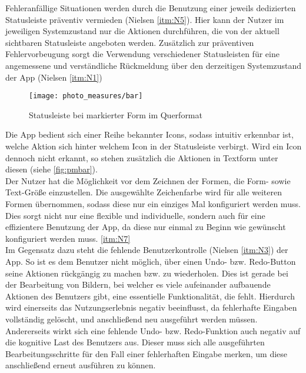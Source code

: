 Fehleranfällige Situationen werden durch die Benutzung einer jeweils dedizierten Statusleiste präventiv vermieden (Nielsen \autoref{itm:N5}).
Hier kann der Nutzer im jeweiligen Systemzustand nur die Aktionen durchführen, die von der aktuell sichtbaren Statusleiste angeboten werden.
Zusätzlich zur präventiven Fehlervorbeugung sorgt die Verwendung verschiedener Statusleisten für eine angemessene und verständliche Rückmeldung über den derzeitigen Systemzustand der App (Nielsen \autoref{itm:N1}) \\

\begin{wrapfigure}{R}{0.4\textwidth}
  \centering
  \texttt{[image: photo\_measures/bar]}
  \caption{Statusleiste bei markierter Form im Querformat}
  \label{fig:pmbar}
\end{wrapfigure}

\noindent
Die App bedient sich einer Reihe bekannter Icons, sodass intuitiv erkennbar ist, welche Aktion sich hinter welchem Icon in der Statusleiste verbirgt.
Wird ein Icon dennoch nicht erkannt, so stehen zusätzlich die Aktionen in Textform unter diesen (siehe \autoref{fig:pmbar}). \\

Der Nutzer hat die Möglichkeit vor dem Zeichnen der Formen, die Form- sowie Text-Größe einzustellen.
Die ausgewählte Zeichenfarbe wird für alle weiteren Formen übernommen, sodass diese nur ein einziges Mal konfiguriert werden muss.
Dies sorgt nicht nur eine flexible und individuelle, sondern auch für eine effizientere Benutzung der App, da diese nur einmal zu Beginn wie gewünscht konfiguriert werden muss. \autoref{itm:N7} \\

Im Gegensatz dazu steht die fehlende Benutzerkontrolle (Nielsen \autoref{itm:N3}) der App.
So ist es dem Benutzer nicht möglich, über einen Undo- bzw. Redo-Button seine Aktionen rückgängig zu machen bzw. zu wiederholen.
Dies ist gerade bei der Bearbeitung von Bildern, bei welcher es viele aufeinander aufbauende Aktionen des Benutzers gibt, eine essentielle Funktionalität, die fehlt.
Hierdurch wird einerseits das Nutzungserlebnis negativ beeinflusst, da fehlerhafte Eingaben vollständig gelöscht, und anschließend neu ausgeführt werden müssen.
Andererseits wirkt sich eine fehlende Undo- bzw. Redo-Funktion auch negativ auf die kognitive Last des Benutzers aus.
Dieser muss sich alle ausgeführten Bearbeitungsschritte für den Fall einer fehlerhaften Eingabe merken, um diese anschließend erneut ausführen zu können. \\

